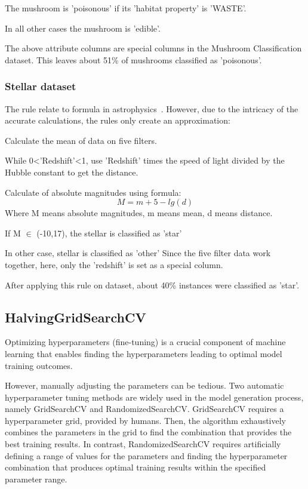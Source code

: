 \documentclass[runningheads,a4paper]{llncs}
\begin{document}
The mushroom is 'poisonous' if its 'habitat property' is 'WASTE'.

In all other cases the mushroom is 'edible'.

The above attribute columns are special columns in the Mushroom Classification dataset.
This leaves about 51\% of mushrooms classified as 'poisonous'.
\subsubsection{Stellar dataset}
The rule relate to formula in astrophysics~\cite{ryden2020foundations}. However, due to the intricacy of the accurate calculations, the rules only create an approximation:


Calculate the mean of data on five filters.

While  0\textless'Redshift'\textless1, use 'Redshift' times the speed of light divided by the Hubble constant to get the distance.

Calculate of absolute magnitudes using formula:
\begin{equation}
M = m + 5 - lg(d)
\end{equation}
Where M means absolute magnitudes, m means mean, d means distance.

If M $\in$ (-10,17), the stellar is classified as 'star'

In other case, stellar is classified as 'other'
Since the five filter data work together, here, only the 'redshift' is set as a special column.

After applying this rule on dataset, about 40\% instances were classified as 'star'.
\subsection{HalvingGridSearchCV}
Optimizing hyperparameters (fine-tuning) is a crucial component of machine learning that enables finding the hyperparameters leading to optimal model training outcomes.

However, manually adjusting the parameters can be tedious.
Two automatic hyperparameter tuning methods are widely used in the model generation process, namely GridSearchCV and RandomizedSearchCV. GridSearchCV requires a hyperparameter grid, provided by humans. Then, the algorithm exhaustively combines the parameters in the grid to find the combination that provides the best training results.
In contrast, RandomizedSearchCV requires artificially defining a range of values for the parameters and finding the hyperparameter combination that produces optimal training results within the specified parameter range.
\end{document}

